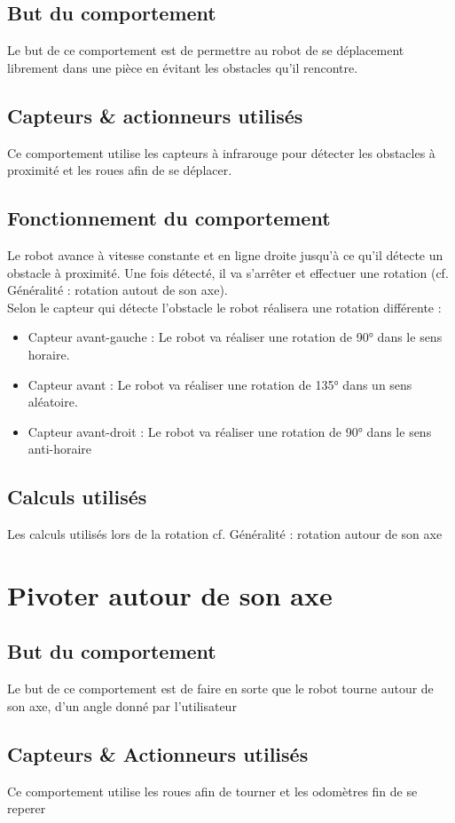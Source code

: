 \documentclass[11pt]{article} %
\begin{document}
        \subsection{But du comportement}
		Le but de ce comportement est de permettre au robot de se déplacement librement dans une pièce en évitant les obstacles qu'il rencontre.
        \subsection{Capteurs \& actionneurs utilisés}
		Ce comportement utilise les capteurs à infrarouge pour détecter les obstacles à proximité et les roues afin de se déplacer.
        \subsection{Fonctionnement du comportement}
		Le robot avance à vitesse constante et en ligne droite jusqu'à ce qu'il détecte un obstacle à proximité. Une fois détecté, il va s'arrêter et effectuer une rotation (cf. Généralité : rotation autout de son axe). \\ 
		Selon le capteur qui détecte l'obstacle le robot réalisera une rotation différente :
		\begin{itemize}
			\item{Capteur avant-gauche :} Le robot va réaliser une rotation de 90° dans le sens horaire.
			\item{Capteur avant :} Le robot va réaliser une rotation de 135° dans un sens aléatoire.
			\item{Capteur avant-droit :} Le robot va réaliser une rotation de 90° dans le sens anti-horaire
		\end{itemize}
        \subsection{Calculs utilisés}
		Les calculs utilisés lors de la rotation cf. Généralité : rotation autour de son axe
	\section{Pivoter autour de son axe}
		\subsection{But du comportement}
			Le but de ce comportement est de faire en sorte que le robot tourne autour de son axe, d'un angle donné par l'utilisateur
		\subsection{Capteurs \& Actionneurs utilisés}
			Ce comportement utilise les roues afin de tourner et les odomètres fin de se reperer
\end{document}
